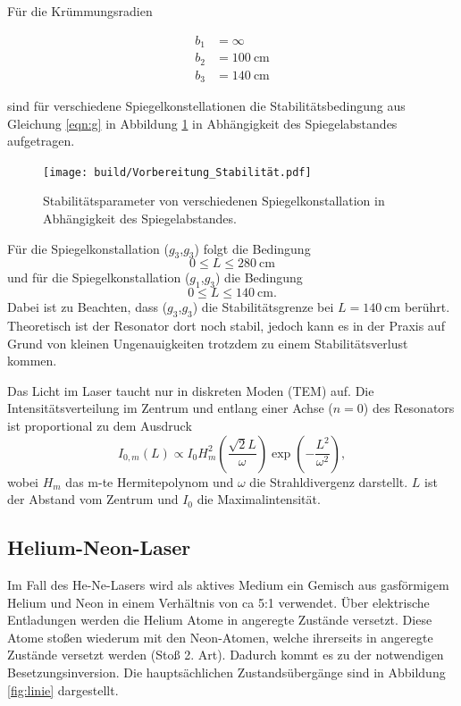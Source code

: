 Für die Krümmungsradien

\begin{align*}
    b_1 & = \infty \\
    b_2 & = \SI{100}{\centi\m} \\
    b_3 & = \SI{140}{\centi\m}
\end{align*}

sind für verschiedene Spiegelkonstellationen die Stabilitätsbedingung aus Gleichung \eqref{eqn:g} in Abbildung \ref{fig:vor} in Abhängigkeit des Spiegelabstandes aufgetragen.

\begin{figure}
    \centering
    \texttt{[image: build/Vorbereitung\_Stabilität.pdf]}
    \caption{Stabilitätsparameter von verschiedenen Spiegelkonstallation in Abhängigkeit des Spiegelabstandes.}
    \label{fig:vor}
\end{figure}

Für die Spiegelkonstallation ($g_3$,$g_3$) folgt die Bedingung
\begin{equation}
    0 \leq L \leq \SI{280}{\cm}
\end{equation}
und für die Spiegelkonstallation ($g_1$,$g_3$) die Bedingung
\begin{equation}
    0 \leq L \leq \SI{140}{\cm}.
\end{equation}
Dabei ist zu Beachten, dass ($g_3$,$g_3$) die Stabilitätsgrenze bei $L = \SI{140}{\cm}$ berührt. Theoretisch ist der Resonator dort noch stabil, jedoch kann es in der Praxis auf Grund von kleinen Ungenauigkeiten trotzdem zu einem Stabilitätsverlust kommen.


\subject{Moden im Resonator}

Das Licht im Laser taucht nur in diskreten Moden (TEM) auf. 
Die Intensitätsverteilung im Zentrum und entlang einer Achse ($n=0$) des Resonators ist proportional zu dem Ausdruck 
\begin{equation}
    \label{eqn:mode}
    I_{0,m}(L) \propto I_0 H_m^2\left(\frac{\sqrt{2}L}{\omega}\right)\exp{\left(-\frac{L^2}{\omega^2}\right)},
\end{equation}
wobei $H_m$ das m-te Hermitepolynom und $\omega$ die Strahldivergenz darstellt. $L$ ist der Abstand vom Zentrum und $I_0$ die Maximalintensität.

\subsection{Helium-Neon-Laser}
Im Fall des He-Ne-Lasers wird als aktives Medium ein Gemisch aus gasförmigem Helium und Neon in einem Verhältnis von ca 5:1 verwendet.
Über elektrische Entladungen werden die Helium Atome in angeregte Zustände versetzt. Diese Atome stoßen wiederum mit den Neon-Atomen, welche ihrerseits in angeregte Zustände versetzt werden (Stoß 2. Art). Dadurch kommt es zu der notwendigen Besetzungsinversion. Die hauptsächlichen Zustandsübergänge sind in Abbildung \ref{fig:linie} dargestellt.


